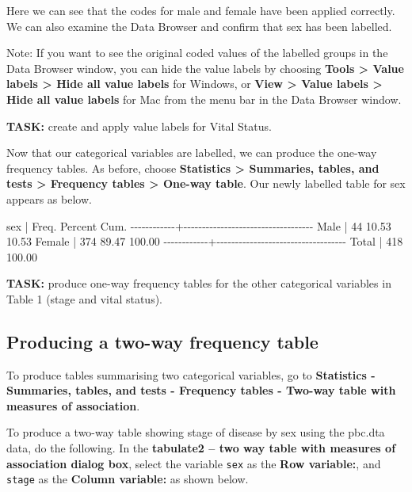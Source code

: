 \documentclass[
]{memoir}
\newenvironment{Shaded}{\begin{snugshade}}{\end{snugshade}}
\newcommand{\NormalTok}[1]{#1}
\begin{document}
Here we can see that the codes for male and female have been applied correctly. We can also examine the Data Browser and confirm that sex has been labelled.

Note: If you want to see the original coded values of the labelled groups in the Data Browser window, you can hide the value labels by choosing \textbf{Tools \textgreater{} Value labels \textgreater{} Hide all value labels} for Windows, or \textbf{View \textgreater{} Value labels \textgreater{} Hide all value labels} for Mac from the menu bar in the Data Browser window.

\textbf{TASK:} create and apply value labels for Vital Status.

Now that our categorical variables are labelled, we can produce the one-way frequency tables. As before, choose \textbf{Statistics \textgreater{} Summaries, tables, and tests \textgreater{} Frequency tables \textgreater{} One-way table}. Our newly labelled table for sex appears as below.

\begin{Shaded}
\begin{Highlighting}[]
\NormalTok{        sex |      Freq.     Percent        Cum.}
\NormalTok{{-}{-}{-}{-}{-}{-}{-}{-}{-}{-}{-}{-}+{-}{-}{-}{-}{-}{-}{-}{-}{-}{-}{-}{-}{-}{-}{-}{-}{-}{-}{-}{-}{-}{-}{-}{-}{-}{-}{-}{-}{-}{-}{-}{-}{-}{-}{-}}
\NormalTok{       Male |         44       10.53       10.53}
\NormalTok{     Female |        374       89.47      100.00}
\NormalTok{{-}{-}{-}{-}{-}{-}{-}{-}{-}{-}{-}{-}+{-}{-}{-}{-}{-}{-}{-}{-}{-}{-}{-}{-}{-}{-}{-}{-}{-}{-}{-}{-}{-}{-}{-}{-}{-}{-}{-}{-}{-}{-}{-}{-}{-}{-}{-}}
\NormalTok{      Total |        418      100.00}
\end{Highlighting}
\end{Shaded}

\textbf{TASK:} produce one-way frequency tables for the other categorical variables in Table 1 (stage and vital status).

\hypertarget{producing-a-two-way-frequency-table}{%
\subsection{Producing a two-way frequency table}\label{producing-a-two-way-frequency-table}}

To produce tables summarising two categorical variables, go to \textbf{Statistics - Summaries, tables, and tests - Frequency tables - Two-way table with measures of association}.

To produce a two-way table showing stage of disease by sex using the pbc.dta data, do the following. In the \textbf{tabulate2 -- two way table with measures of association dialog box}, select the variable \texttt{sex} as the \textbf{Row variable:}, and \texttt{stage} as the \textbf{Column variable:} as shown below.
\end{document}
